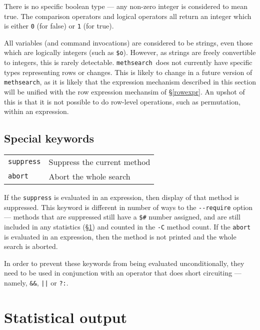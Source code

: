 \documentclass[a4paper,11pt,oneside]{book}
\makeatletter
\newcommand{\oi}[1]{\index{#1@{\hspace*{-\optwidth}\texttt{-}\texttt{#1}}}}
\def\methsearch{\texttt{meth\-search}}
\newcommand{\sref}[1]{\hyperref[#1]{\S\ref{#1}}}
\makeatother
\begin{document}
There is no specific boolean type --- any non-zero
integer is considered to mean true.  The comparison operators and logical 
operators all return an integer which is either \verb+0+ (for false) or 
\verb+1+ (for true).

All variables (and command invocations) are considered to be strings,
even those which are logically integers (such as \verb+$o+).  However,
as strings are freely convertible to integers, this is rarely detectable.
\methsearch\ does not currently have specific types representing rows or
changes.  This is likely to change in a future version of \methsearch, 
as it is likely that the expression mechanism described in this section will
be unified with the row expression mechansim of 
\sref{rowexpr}.  An upshot of this is that it is not possible to do row-level
operations, such as permutation, within an expression.

\subsection{Special keywords}\label{exprkey}

\begin{tabular}{ll}
\verb+suppress+& Suppress the current method\\
\verb+abort+&    Abort the whole search\\
\end{tabular}

If the \verb+suppress+
is evaluated in an expression, then display of that method is suppressed. 
This keyword is different in number of ways to the \verb+--require+
option --- methods that are suppressed still have a \verb+$#+ number assigned,
and are still included in any statistics (\sref{stats}) and counted in the
\verb+-C+\oi{C} method count.
If the \verb+abort+ 
is evaluated in an expression, then the method is not printed and the
whole search is aborted.

In order to prevent these keywords from being evaluated unconditionally,
they need to be used in conjunction with an operator that does short circuiting%
 --- namely, \verb+&&+, \verb+||+ or 
\verb+?:+.
%

\section{Statistical output}\label{stats}
\end{document}
